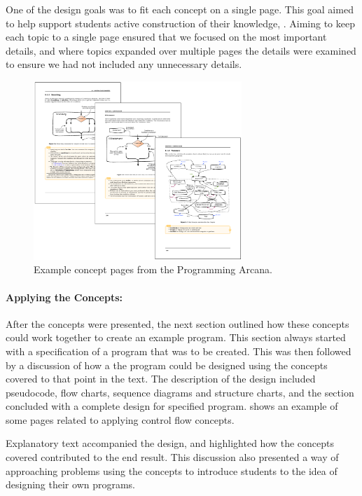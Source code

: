 One of the design goals was to fit each concept on a single page. This goal aimed to help support students active construction of their knowledge, . Aiming to keep each topic to a single page ensured that we focused on the most important details, and where topics expanded over multiple pages the details were examined to ensure we had not included any unnecessary details.

\begin{figure}[h]
  \centering
  \includegraphics[width=0.7\textwidth]{ArcanaConcepts}
  \caption{Example concept pages from the Programming Arcana.}
  \label{fig:arcana_concepts}
\end{figure}


\clearpage
\paragraph{Applying the Concepts:} %
\label{par:applying_the_concepts_}

After the concepts were presented, the next section outlined how these concepts could work together to create an example program. This section always started with a specification of a program that was to be created. This was then followed by a discussion of how a the program could be designed using the concepts covered to that point in the text. The description of the design included pseudocode, flow charts, sequence diagrams and structure charts, and the section concluded with a complete design for specified program.  shows an example of some pages related to applying control flow concepts.

Explanatory text accompanied the design, and highlighted how the concepts covered contributed to the end result. This discussion also presented a way of approaching problems using the concepts to introduce students to the idea of designing their own programs.

